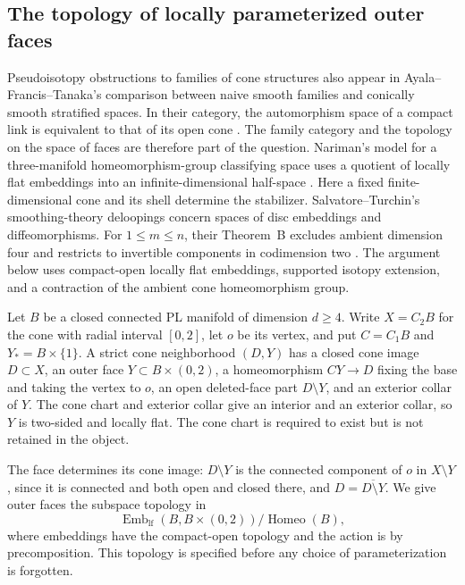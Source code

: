 \subsection{The topology of locally parameterized outer faces}

Pseudoisotopy obstructions to families of cone structures also appear
in Ayala--Francis--Tanaka's comparison between naive smooth families
and conically smooth stratified spaces.  In their category, the
automorphism space of a compact link is equivalent to that of its
open cone \cite[arXiv version~6, pp.~3--4; Theorem~4.3.1,
p.~46]{AyalaFrancisTanaka2017v6}.
The family category and the topology on the space of faces are
therefore part of the question.
Nariman's model for a three-manifold homeomorphism-group classifying space uses a
quotient of locally flat embeddings into an infinite-dimensional
half-space \cite[Section~7, pp.~13--14, especially Definition~7.1]
{Nariman2025}.  Here a fixed finite-dimensional cone and its shell
determine the stabilizer.
Salvatore--Turchin's smoothing-theory deloopings concern spaces of
disc embeddings and diffeomorphisms.  For $1\le m\le n$, their
Theorem~B excludes ambient dimension four and restricts to
invertible components in codimension two
\cite[pp.~2--3]{SalvatoreTurchin2026}.
The argument below uses compact-open locally flat embeddings,
supported isotopy extension, and a contraction of the ambient
cone homeomorphism group.

Let $B$ be a closed connected PL manifold of dimension $d\geq4$.
Write $X=C_2B$ for the cone with radial interval $[0,2]$, let $o$ be
its vertex, and put $C=C_1B$ and $Y_*=B\times\{1\}$.
A strict cone neighborhood $(D,Y)$ has a closed cone image $D\subset X$,
an outer face $Y\subset B\times(0,2)$, a homeomorphism $CY\to D$
fixing the base and taking the vertex to $o$, an open deleted-face
part $D\setminus Y$, and an exterior collar of $Y$.
The cone chart and exterior collar give an interior and an exterior
collar, so $Y$ is two-sided and locally flat.
The cone chart is required to exist but is not retained in the object.

The face determines its cone image: $D\setminus Y$ is the connected
component of $o$ in $X\setminus Y$, since it is connected and both
open and closed there, and $D=\overline{D\setminus Y}$.
We give outer faces the subspace topology in
\[
 \operatorname{Emb}_{\mathrm{lf}}(B,B\times(0,2))
       /\operatorname{Homeo}(B),
\]
where embeddings have the compact-open topology and the action is by
precomposition.  This topology is specified before any choice of
parameterization is forgotten.

